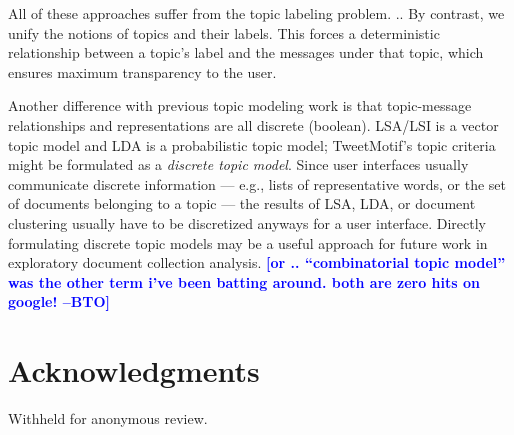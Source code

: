 \documentclass[letterpaper]{article}
\newcommand{\bto}[1]{\textcolor{blue}{\textbf{[#1 --BTO]}}}
\begin{document}
All of these approaches suffer from the topic labeling problem. ..  By contrast, we unify the notions of topics and their labels.  This forces a deterministic relationship between a topic's label and the messages under that topic, which ensures maximum transparency to the user.

Another difference with previous topic modeling work is that topic-message relationships and representations are all discrete (boolean).  LSA/LSI is a vector topic model and LDA is a probabilistic topic model; TweetMotif's topic criteria might be formulated as a \emph{discrete topic model}.  Since user interfaces usually communicate discrete information --- e.g., lists of representative words, or the set of documents belonging to a topic --- the results of LSA, LDA, or document clustering usually have to be discretized anyways for a user interface.  Directly formulating discrete topic models may be a useful approach for future work in exploratory document collection analysis.  \bto{or .. ``combinatorial topic model'' was the other term i've been batting around.  both are zero hits on google!}

\section{Acknowledgments}

Withheld for anonymous review.



\end{document}
